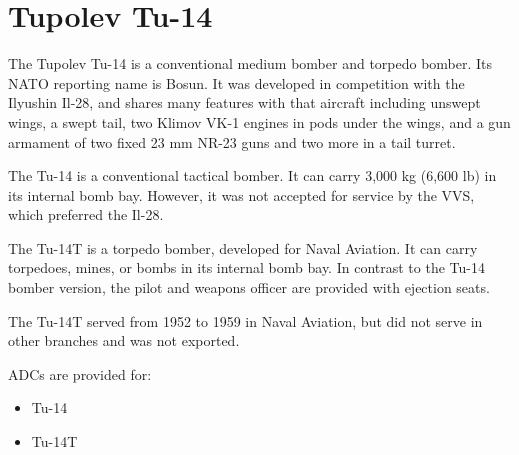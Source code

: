 \section*{Tupolev Tu-14}

The Tupolev Tu-14 is a conventional medium bomber and torpedo bomber. Its NATO reporting name is Bosun. It was developed in competition with the Ilyushin Il-28, and shares many features with that aircraft including unswept wings, a swept tail, two Klimov VK-1 engines in pods under the wings, and a gun armament of two fixed 23 mm NR-23 guns and two more in a tail turret.

The Tu-14 is a conventional tactical bomber. It can carry 3,000 kg (6,600 lb) in its internal bomb bay. However, it was not accepted for service by the VVS, which preferred the Il-28.

The Tu-14T is a torpedo bomber, developed for Naval Aviation. It can carry torpedoes, mines, or bombs in its internal bomb bay. In contrast to the Tu-14 bomber version, the pilot and weapons officer are provided with ejection seats.

The Tu-14T served from 1952 to 1959 in Naval Aviation, but did not serve in other branches and was not exported.

ADCs are provided for:
\begin{itemize}
    \item Tu-14
    \item Tu-14T
\end{itemize}